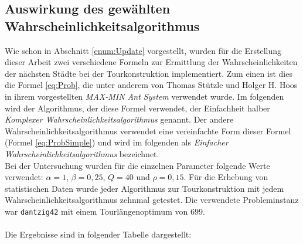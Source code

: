 \documentclass[doktyp=barbeit, sprache=german]{TUBAFarbeiten}
\begin{document}
\subsection{Auswirkung des gewählten Wahrscheinlichkeitsalgorithmus}
\label{AuswirkungWA}
Wie schon in Abschnitt \ref{enum:Update} vorgestellt, wurden für die Erstellung dieser Arbeit zwei verschiedene Formeln zur Ermittlung der Wahrscheinlichkeiten der nächsten Städte bei der Tourkonstruktion implementiert. Zum einen ist dies die Formel \ref{eq:Prob}, die unter anderem von Thomas Stützle und Holger H. Hoos in ihrem vorgestellten \textit{MAX-MIN Ant System} verwendet wurde. Im folgenden wird der Algorithmus, der diese Formel verwendet, der Einfachheit halber \textit{Komplexer Wahrscheinlichkeitsalgorithmus} genannt. Der andere Wahrscheinlichkeitsalgorithmus verwendet eine vereinfachte Form dieser Formel (Formel \ref{eq:ProbSimple}) und wird im folgenden als \textit{Einfacher Wahrscheinlichkeitsalgorithmus} bezeichnet.
\\Bei der Untersuchung wurden für die einzelnen Parameter folgende Werte verwendet: $\alpha = 1$, $\beta = 0,25$, $Q = 40$ und $\rho = 0,15$. Für die Erhebung von statistischen Daten wurde jeder Algorithmus zur Tourkonstruktion mit jedem Wahrscheinlichkeitsalgorithmus zehnmal getestet. Die verwendete Probleminstanz war \texttt{dantzig42} mit einem Tourlängenoptimum von $699$.
\\\\Die Ergebnisse sind in folgender Tabelle dargestellt:
\end{document}
